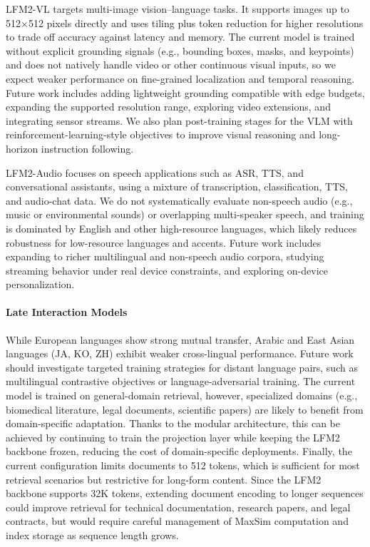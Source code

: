 \documentclass{article}
\begin{document}
LFM2-VL targets multi-image vision–language tasks. It supports images up to 512$\times$512 pixels directly and uses tiling plus token reduction for higher resolutions to trade off accuracy against latency and memory. The current model is trained without explicit grounding signals (e.g., bounding boxes, masks, and keypoints) and does not natively handle video or other continuous visual inputs, so we expect weaker performance on fine-grained localization and temporal reasoning. Future work includes adding lightweight grounding compatible with edge budgets, expanding the supported resolution range, exploring video extensions, and integrating sensor streams. We also plan post-training stages for the VLM with reinforcement-learning-style objectives to improve visual reasoning and long-horizon instruction following.

LFM2-Audio focuses on speech applications such as ASR, TTS, and conversational assistants, using a mixture of transcription, classification, TTS, and audio-chat data. We do not systematically evaluate non-speech audio (e.g., music or environmental sounds) or overlapping multi-speaker speech, and training is dominated by English and other high-resource languages, which likely reduces robustness for low-resource languages and accents. Future work includes expanding to richer multilingual and non-speech audio corpora, studying streaming behavior under real device constraints, and exploring on-device personalization.

\paragraph{Late Interaction Models}
While European languages show strong mutual transfer, Arabic and East Asian languages (JA, KO, ZH) exhibit weaker cross-lingual performance. Future work should investigate targeted training strategies for distant language pairs, such as multilingual contrastive objectives or language-adversarial training. The current model is trained on general-domain retrieval, however, specialized domains (e.g., biomedical literature, legal documents, scientific papers) are likely to benefit from domain-specific adaptation. Thanks to the modular architecture, this can be achieved by continuing to train the projection layer while keeping the LFM2 backbone frozen, reducing the cost of domain-specific deployments. Finally, the current configuration limits documents to 512 tokens, which is sufficient for most retrieval scenarios but restrictive for long-form content. Since the LFM2 backbone supports 32K tokens, extending document encoding to longer sequences could improve retrieval for technical documentation, research papers, and legal contracts, but would require careful management of MaxSim computation and index storage as sequence length grows.
\end{document}
